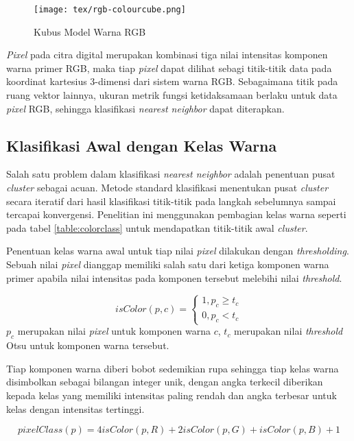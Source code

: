 \documentclass[laporan.tex]{subfiles}
\begin{document}
\begin{figure}[h]
\centering
\texttt{[image: tex/rgb-colourcube.png]}
\caption{Kubus Model Warna RGB}
\end{figure}

\emph{Pixel} pada citra digital merupakan kombinasi tiga nilai intensitas komponen warna primer RGB, maka tiap \emph{pixel} dapat dilihat sebagi titik-titik data pada koordinat kartesius 3-dimensi dari sistem warna RGB. Sebagaimana titik pada ruang vektor lainnya, ukuran metrik fungsi ketidaksamaan berlaku untuk data \emph{pixel} RGB, sehingga klasifikasi \emph{nearest neighbor} dapat diterapkan.

\subsection{Klasifikasi Awal dengan Kelas Warna}
Salah satu problem dalam klasifikasi \emph{nearest neighbor} adalah penentuan pusat \emph{cluster} sebagai acuan. Metode standard klasifikasi menentukan pusat \emph{cluster} secara iteratif dari hasil klasifikasi titik-titik pada langkah sebelumnya sampai tercapai konvergensi. Penelitian ini menggunakan pembagian kelas warna seperti pada tabel \ref{table:colorclass} untuk mendapatkan titik-titik awal \emph{cluster}.

Penentuan kelas warna awal untuk tiap nilai \emph{pixel} dilakukan dengan \emph{thresholding}. Sebuah nilai \emph{pixel} dianggap memiliki salah satu dari ketiga komponen warna primer apabila nilai intensitas pada komponen tersebut melebihi nilai \emph{threshold}.

\begin{equation}
	isColor(p,c) = \begin{cases}
			1, p_c \geq t_c \\
			0, p_c < t_c
		\end{cases}
\end{equation}
$p_c$ merupakan nilai \emph{pixel} untuk komponen warna $c$, $t_c$ merupakan nilai \emph{threshold} Otsu untuk komponen warna tersebut.

Tiap komponen warna diberi bobot sedemikian rupa sehingga tiap kelas warna disimbolkan sebagai bilangan integer unik, dengan angka terkecil diberikan kepada kelas yang memiliki intensitas paling rendah dan angka terbesar untuk kelas dengan intensitas tertinggi.

\begin{equation}
	pixelClass(p) = 4 isColor(p,R) + 2 isColor(p,G) + isColor(p,B) + 1
\end{equation}
\end{document}
